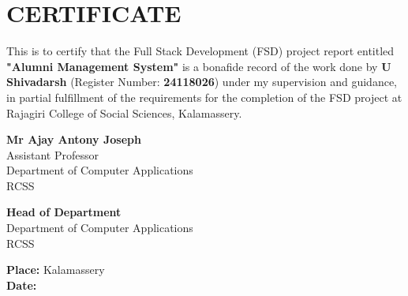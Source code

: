 \chapter*{CERTIFICATE}
\vspace{1cm}
This is to certify that the Full Stack Development (FSD) project report entitled \textbf{"Alumni Management System"} is a bonafide record of the work done by \textbf{U Shivadarsh} (Register Number: \textbf{24118026}) under my supervision and guidance, in partial fulfillment of the requirements for the completion of the FSD project at Rajagiri College of Social Sciences, Kalamassery.

\vspace{3cm}

\begin{minipage}{0.45\textwidth}
\begin{flushleft}
\textbf{Mr Ajay Antony Joseph}\\
Assistant Professor\\
Department of Computer Applications\\
RCSS
\end{flushleft}
\end{minipage}
\hfill
\begin{minipage}{0.45\textwidth}
\begin{flushright}
\textbf{Head of Department}\\
Department of Computer Applications\\
RCSS
\end{flushright}
\end{minipage}

\vspace{2cm}
\begin{flushleft}
\textbf{Place:} Kalamassery\\
\textbf{Date:} 
\end{flushleft}

